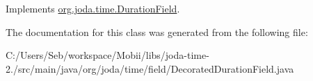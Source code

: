 Implements \hyperlink{classorg_1_1joda_1_1time_1_1_duration_field_aa068ba156fd9dc06ce2d6121690795fc}{org.\-joda.\-time.\-Duration\-Field}.



The documentation for this class was generated from the following file\-:\begin{DoxyCompactItemize}
\item 
C\-:/\-Users/\-Seb/workspace/\-Mobii/libs/joda-\/time-\/2./src/main/java/org/joda/time/field/Decorated\-Duration\-Field.\-java\end{DoxyCompactItemize}
